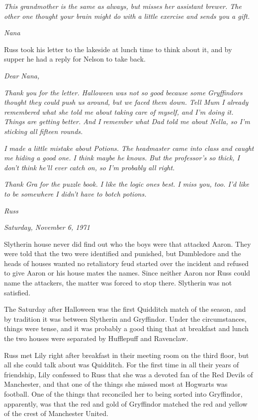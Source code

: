 \documentclass[a4paper,11pt]{article}
\begin{document}
\emph{This grandmother is the same as always, but misses her assistant brewer. The other one thought your brain might do with a little exercise and sends you a gift.}

\emph{Nana}

Russ took his letter to the lakeside at lunch time to think about it, and by supper he had a reply for Nelson to take back.

\emph{Dear Nana,}

\emph{Thank you for the letter. Halloween was not so good because some Gryffindors thought they could push us around, but we faced them down. Tell Mum I already remembered what she told me about taking care of myself, and I'm doing it. Things are getting better. And I remember what Dad told me about Nella, so I'm sticking all fifteen rounds.}

\emph{I made a little mistake about Potions. The headmaster came into class and caught me hiding a good one. I think maybe he knows. But the professor's so thick, I don't think he'll ever catch on, so I'm probably all right.}

\emph{Thank Gra for the puzzle book. I like the logic ones best. I miss you, too. I'd like to be somewhere I didn't have to botch potions.}

\emph{Russ}

\emph{Saturday, November 6, 1971}

Slytherin house never did find out who the boys were that attacked Aaron. They were told that the two were identified and punished, but Dumbledore and the heads of houses wanted no retaliatory feud started over the incident and refused to give Aaron or his house mates the names. Since neither Aaron nor Russ could name the attackers, the matter was forced to stop there. Slytherin was not satisfied.

The Saturday after Halloween was the first Quidditch match of the season, and by tradition it was between Slytherin and Gryffindor. Under the circumstances, things were tense, and it was probably a good thing that at breakfast and lunch the two houses were separated by Hufflepuff and Ravenclaw.

Russ met Lily right after breakfast in their meeting room on the third floor, but all she could talk about was Quidditch. For the first time in all their years of friendship, Lily confessed to Russ that she was a devoted fan of the Red Devils of Manchester, and that one of the things she missed most at Hogwarts was football. One of the things that reconciled her to being sorted into Gryffindor, apparently, was that the red and gold of Gryffindor matched the red and yellow of the crest of Manchester United.
\end{document}
